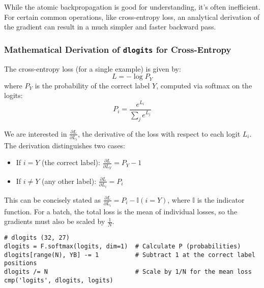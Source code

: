 While the atomic backpropagation is good for understanding, it's often inefficient. For certain common operations, like cross-entropy loss, an analytical derivation of the gradient can result in a much simpler and faster backward pass.

\subsubsection{Mathematical Derivation of \texttt{dlogits} for Cross-Entropy}
The cross-entropy loss (for a single example) is given by:
$$L = -\log P_Y$$
where $P_Y$ is the probability of the correct label $Y$, computed via softmax on the logits:
$$P_i = \frac{e^{L_i}}{\sum_j e^{L_j}}$$

We are interested in $\frac{\partial L}{\partial L_i}$, the derivative of the loss with respect to each logit $L_i$.
The derivation distinguishes two cases:
\begin{itemize}
    \item If $i = Y$ (the correct label): $\frac{\partial L}{\partial L_Y} = P_Y - 1$
    \item If $i \neq Y$ (any other label): $\frac{\partial L}{\partial L_i} = P_i$
\end{itemize}
This can be concisely stated as $\frac{\partial L}{\partial L_i} = P_i - \mathbb{I}(i=Y)$, where $\mathbb{I}$ is the indicator function.
For a batch, the total loss is the mean of individual losses, so the gradients must also be scaled by $\frac{1}{N}$.

\begin{lstlisting}[caption={Analytical dlogits for Cross-Entropy}]
# dlogits (32, 27)
dlogits = F.softmax(logits, dim=1)  # Calculate P (probabilities)
dlogits[range(N), YB] -= 1          # Subtract 1 at the correct label positions
dlogits /= N                        # Scale by 1/N for the mean loss
cmp('logits', dlogits, logits)
\end{lstlisting}

